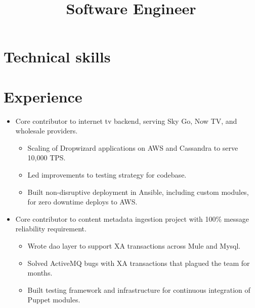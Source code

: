 \documentclass[11pt,a4paper,roman]{moderncv}
\title{Software Engineer}
\begin{document}
\makecvtitle

\section{Technical skills}

\section{Experience}

\begin{itemize}
\item Core contributor to internet tv backend, serving Sky Go, Now TV, and wholesale providers.
  \begin{itemize}
  \item Scaling of Dropwizard applications on AWS and Cassandra to serve 10,000 TPS.
  \item Led improvements to testing strategy for codebase.
  \item Built non-disruptive deployment in Ansible, including custom modules, for zero downtime deploys to AWS.
  \end{itemize}
\item Core contributor to content metadata ingestion project with 100\% message reliability requirement.
  \begin{itemize}
  \item Wrote dao layer to support XA transactions across Mule and Mysql.
  \item Solved ActiveMQ bugs with XA transactions that plagued the team for months.
  \item Built testing framework and infrastructure for continuous integration of Puppet modules.
  \end{itemize}
\end{itemize}

\vspace{5mm}
\end{document}

